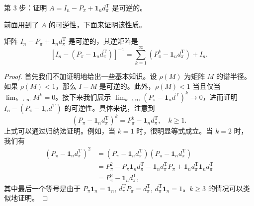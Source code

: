 \begin{note}
第 3 步：证明 $A = I_n - P_{\pi} + \mathbf{1}_n d_{\pi}^{\mathrm{T}}$ 是可逆的。

前面用到了 $A$ 的可逆性，下面来证明该性质。

\begin{lemma}
\label{lem:rl-pg-invertible}
矩阵 $I_n - P_{\pi} + \mathbf{1}_n d_{\pi}^{\mathrm{T}}$ 是可逆的，其逆矩阵是
\begin{equation}
\left[ I_n - (P_{\pi} - \mathbf{1}_n d_{\pi}^{\mathrm{T}}) \right]^{-1} = \sum_{k=1}^{\infty} (P_{\pi}^{k} - \mathbf{1}_n d_{\pi}^{\mathrm{T}}) + I_n.
\end{equation}
\end{lemma}

\begin{proof}
首先我们不加证明地给出一些基本知识。设 $\rho(M)$ 为矩阵 $M$ 的谱半径。如果 $\rho(M) < 1$，那么 $I - M$ 是可逆的。此外，$\rho(M) < 1$ 当且仅当 $\lim_{k \to \infty} M^k = 0$。接下来我们展示 $\lim_{k \to \infty} (P_\pi - \mathbf{1}_n d^{\mathrm{T}})^k \to 0$，进而证明 $I_n - (P_\pi - \mathbf{1}_n d^{\mathrm{T}})$ 的可逆性。具体来说，注意到
\begin{equation}
(P_{\pi} - \mathbf{1}_n d_{\pi}^{\mathrm{T}})^{k} = P_{\pi}^{k} - \mathbf{1}_n d_{\pi}^{\mathrm{T}}, \quad k \geqslant 1.
\label{eq:rl-pg-power-induction}
\end{equation}
上式可以通过归纳法证明。例如，当 $k = 1$ 时，很明显等式成立。当 $k = 2$ 时，我们有
\begin{equation}
\begin{aligned}
(P_{\pi} - \mathbf{1}_n d_{\pi}^{\mathrm{T}})^{2} &= (P_{\pi} - \mathbf{1}_n d_{\pi}^{\mathrm{T}})(P_{\pi} - \mathbf{1}_n d_{\pi}^{\mathrm{T}}) \\
&= P_{\pi}^{2} - P_{\pi} \mathbf{1}_n d_{\pi}^{\mathrm{T}} - \mathbf{1}_n d_{\pi}^{\mathrm{T}} P_{\pi} + \mathbf{1}_n d_{\pi}^{\mathrm{T}} \mathbf{1}_n d_{\pi}^{\mathrm{T}} \\
&= P_{\pi}^{2} - \mathbf{1}_n d_{\pi}^{\mathrm{T}},
\end{aligned}
\end{equation}
其中最后一个等号是由于 $P_{\pi} \mathbf{1}_n = \mathbf{1}_n$, $d_{\pi}^{\mathrm{T}} P_{\pi} = d_{\pi}^{\mathrm{T}}$, $d_{\pi}^{\mathrm{T}} \mathbf{1}_n = 1$。$k \geqslant 3$ 的情况可以类似地证明。


\end{proof}
\end{note}

